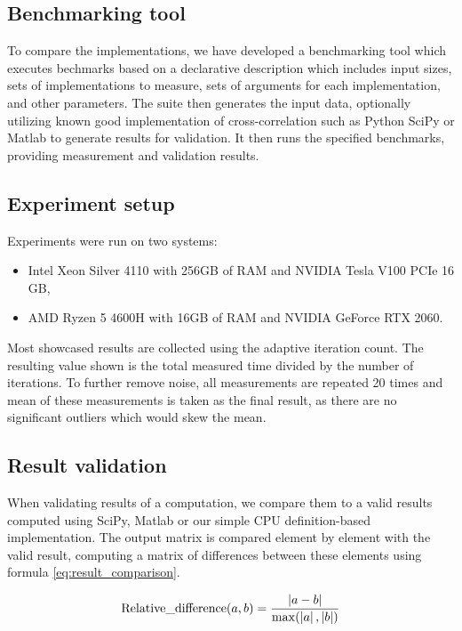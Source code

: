 \subsection{Benchmarking tool}

To compare the implementations, we have developed a benchmarking tool which executes bechmarks based on a declarative description which includes input sizes, sets of implementations to measure, sets of arguments for each implementation, and other parameters. The suite then generates the input data, optionally utilizing known good implementation of cross-correlation such as Python SciPy or Matlab to generate results for validation. It then runs the specified benchmarks, providing measurement and validation results.

\subsection{Experiment setup}

Experiments were run on two systems:
\begin{itemize}
	\item Intel Xeon Silver 4110 with 256GB of RAM and NVIDIA Tesla V100 PCIe 16 GB,
	\item AMD Ryzen 5 4600H with 16GB of RAM and NVIDIA GeForce RTX 2060.
\end{itemize}

Most showcased results are collected using the adaptive iteration count. The resulting value shown is the total measured time divided by the number of iterations. To further remove noise, all measurements are repeated 20 times and mean of these measurements is taken as the final result, as there are no significant outliers which would skew the mean.

\subsection{Result validation}


When validating results of a computation, we compare them to a valid results computed using SciPy, Matlab or our simple CPU definition-based implementation. The output matrix is compared element by element with the valid result, computing a matrix of differences between these elements using formula \ref{eq:result_comparison}.

\begin{equation}
\label{eq:result_comparison}
\mathrm{Relative\_difference }(a, b) = \frac{\left|{a - b}\right|}{\max(\left|{a}\right|, \left|{b}\right|)}
\end{equation}

